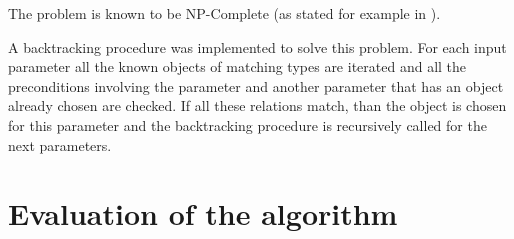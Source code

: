 \documentclass[12pt]{article}
\theoremstyle{definition}
\begin{document}
	The problem is known to be NP-Complete (as stated for example in \cite{NPComplete}). 
	
	A backtracking procedure was implemented to solve this problem. For each input parameter all the known objects of matching types are iterated and all the preconditions involving the parameter and another parameter that has an object already chosen are checked. If all these relations match, than the object is chosen for this parameter and the backtracking procedure is recursively called for the next parameters.
	\newpage
	\section{Evaluation of the algorithm} \label{evaluare}
		
\end{document}
